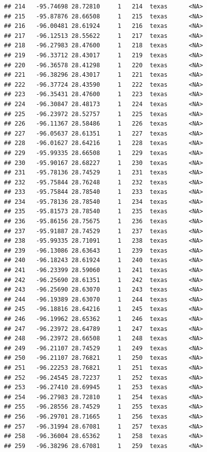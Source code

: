 \documentclass[
]{article}
\begin{document}
\begin{verbatim}
## 214   -95.74698 28.72810     1   214  texas      <NA>
## 215   -95.87876 28.66508     1   215  texas      <NA>
## 216   -96.00481 28.61924     1   216  texas      <NA>
## 217   -96.12513 28.55622     1   217  texas      <NA>
## 218   -96.27983 28.47600     1   218  texas      <NA>
## 219   -96.33712 28.43017     1   219  texas      <NA>
## 220   -96.36578 28.41298     1   220  texas      <NA>
## 221   -96.38296 28.43017     1   221  texas      <NA>
## 222   -96.37724 28.43590     1   222  texas      <NA>
## 223   -96.35431 28.47600     1   223  texas      <NA>
## 224   -96.30847 28.48173     1   224  texas      <NA>
## 225   -96.23972 28.52757     1   225  texas      <NA>
## 226   -96.11367 28.58486     1   226  texas      <NA>
## 227   -96.05637 28.61351     1   227  texas      <NA>
## 228   -96.01627 28.64216     1   228  texas      <NA>
## 229   -95.99335 28.66508     1   229  texas      <NA>
## 230   -95.90167 28.68227     1   230  texas      <NA>
## 231   -95.78136 28.74529     1   231  texas      <NA>
## 232   -95.75844 28.76248     1   232  texas      <NA>
## 233   -95.75844 28.78540     1   233  texas      <NA>
## 234   -95.78136 28.78540     1   234  texas      <NA>
## 235   -95.81573 28.78540     1   235  texas      <NA>
## 236   -95.86156 28.75675     1   236  texas      <NA>
## 237   -95.91887 28.74529     1   237  texas      <NA>
## 238   -95.99335 28.71091     1   238  texas      <NA>
## 239   -96.13086 28.63643     1   239  texas      <NA>
## 240   -96.18243 28.61924     1   240  texas      <NA>
## 241   -96.23399 28.59060     1   241  texas      <NA>
## 242   -96.25690 28.61351     1   242  texas      <NA>
## 243   -96.25690 28.63070     1   243  texas      <NA>
## 244   -96.19389 28.63070     1   244  texas      <NA>
## 245   -96.18816 28.64216     1   245  texas      <NA>
## 246   -96.19962 28.65362     1   246  texas      <NA>
## 247   -96.23972 28.64789     1   247  texas      <NA>
## 248   -96.23972 28.66508     1   248  texas      <NA>
## 249   -96.21107 28.74529     1   249  texas      <NA>
## 250   -96.21107 28.76821     1   250  texas      <NA>
## 251   -96.22253 28.76821     1   251  texas      <NA>
## 252   -96.24545 28.72237     1   252  texas      <NA>
## 253   -96.27410 28.69945     1   253  texas      <NA>
## 254   -96.27983 28.72810     1   254  texas      <NA>
## 255   -96.28556 28.74529     1   255  texas      <NA>
## 256   -96.29701 28.71665     1   256  texas      <NA>
## 257   -96.31994 28.67081     1   257  texas      <NA>
## 258   -96.36004 28.65362     1   258  texas      <NA>
## 259   -96.38296 28.67081     1   259  texas      <NA>

\end{verbatim}
\end{document}
